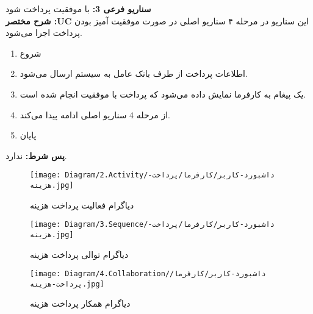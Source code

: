 \noindent
\textbf{سناريو فرعی 3:}
با موفقیت پرداخت ‌شود
\\
\textbf{شرح مختصر :UC}
این سناریو در مرحله ۴ سناریو اصلی در صورت موفقیت آمیز بودن پرداخت اجرا می‌شود.
\begin{enumerate}
\item
شروع
\item
اطلاعات پرداخت از طرف بانک عامل به سیستم ارسال می‌شود.
\item
یک پیغام به کارفرما نمایش داده می‌شود که پرداخت با موفقیت انجام شده است.
\item
از مرحله 4 سناریو اصلی ادامه پیدا می‌کند.
\item
پایان
\end{enumerate}

\noindent
\textbf{پس شرط:}
ندارد.




\begin{figure}[H]
	\centering
	\texttt{[image: Diagram/2.Activity/داشبورد-کاربر/کارفرما/پرداخت-هزینه.jpg]}
	\caption{دیاگرام فعالیت پرداخت هزینه}
	\label{fig:a:پرداخت-هزینه}
\end{figure}
\begin{figure}[H]
	\centering
	\texttt{[image: Diagram/3.Sequence/داشبورد-کاربر/کارفرما/پرداخت-هزینه.jpg]}
	\caption{دیاگرام توالی پرداخت هزینه}
	\label{fig:s:پرداخت-هزینه}
\end{figure}
\begin{figure}[H]
	\centering
	\texttt{[image: Diagram/4.Collaboration/داشبورد-کاربر/کارفرما/پرداخت-هزینه.jpg]}
	\caption{دیاگرام همکار پرداخت هزینه}
	\label{fig:c:پرداخت-هزینه}
\end{figure}